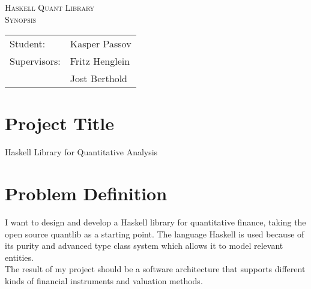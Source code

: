 








\begin{titlepage}
\begin{center}
\textsc{\Large Haskell Quant Library}\\[0.5cm]
\textsc{Synopsis}\\[0.5cm]
\vspace{2 cm}
\begin{tabular}{ll}
Student: & Kasper Passov\\
Supervisors: & Fritz Henglein \\ 
             & Jost Berthold
\end{tabular}
\end{center}
\vspace{5 cm}
\newpage
\tableofcontents
\end{titlepage}

\section{Project Title}
Haskell Library for Quantitative Analysis 

\section{Problem Definition}

I want to design and develop a Haskell library for 
quantitative finance, taking the open source quantlib
as a starting point. The language Haskell is used
because of its purity and advanced type class system
which allows it to model relevant entities.\\
The result of my project should be a software
architecture that supports different kinds of 
financial instruments and valuation methods.

